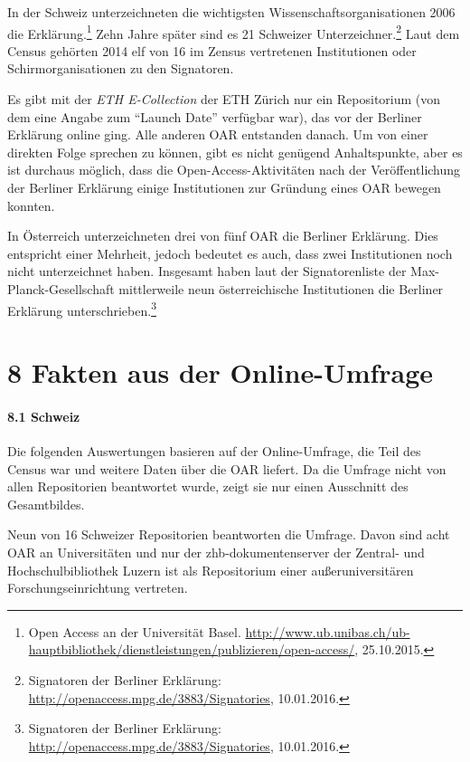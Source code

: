 \documentclass[a4paper,
fontsize=11pt,
oneside,
numbers=noperiodatend,
parskip=half-,
bibliography=totoc,
final
]{scrartcl}
\begin{document}
In der Schweiz unterzeichneten die wichtigsten
Wissenschaftsorganisationen 2006 die Erklärung.\footnote{Open Access an
  der Universität Basel.
  \url{http://www.ub.unibas.ch/ub-hauptbibliothek/dienstleistungen/publizieren/open-access/},
  25.10.2015.} Zehn Jahre später sind es 21 Schweizer
Unterzeichner.\footnote{Signatoren der Berliner Erklärung:
  \url{http://openaccess.mpg.de/3883/Signatories}, 10.01.2016.} Laut dem
Census gehörten 2014 elf von 16 im Zensus vertretenen Institutionen oder
Schirmorganisationen zu den Signatoren.

Es gibt mit der \emph{ETH E-Collection} der ETH Zürich nur ein
Repositorium (von dem eine Angabe zum \enquote{Launch Date} verfügbar
war), das vor der Berliner Erklärung online ging. Alle anderen OAR
entstanden danach. Um von einer direkten Folge sprechen zu können, gibt
es nicht genügend Anhaltspunkte, aber es ist durchaus möglich, dass die
Open-Access-Aktivitäten nach der Veröffentlichung der Berliner Erklärung
einige Institutionen zur Gründung eines OAR bewegen konnten.

In Österreich unterzeichneten drei von fünf OAR die Berliner Erklärung.
Dies entspricht einer Mehrheit, jedoch bedeutet es auch, dass zwei
Institutionen noch nicht unterzeichnet haben. Insgesamt haben laut der
Signatorenliste der Max-Planck-Gesellschaft mittlerweile neun
österreichische Institutionen die Berliner Erklärung
unterschrieben.\footnote{Signatoren der Berliner Erklärung:
  \url{http://openaccess.mpg.de/3883/Signatories}, 10.01.2016.}

\section*{8 Fakten aus der
Online-Umfrage}\label{fakten-aus-der-online-umfrage}

\paragraph{8.1 Schweiz}\label{schweiz-3}

Die folgenden Auswertungen basieren auf der Online-Umfrage, die Teil des
Census war und weitere Daten über die OAR liefert. Da die Umfrage nicht
von allen Repositorien beantwortet wurde, zeigt sie nur einen Ausschnitt
des Gesamtbildes.

Neun von 16 Schweizer Repositorien beantworten die Umfrage. Davon sind
acht OAR an Universitäten und nur der zhb-dokumentenserver der Zentral-
und Hochschulbibliothek Luzern ist als Repositorium einer
außeruniversitären Forschungseinrichtung vertreten.
\end{document}
